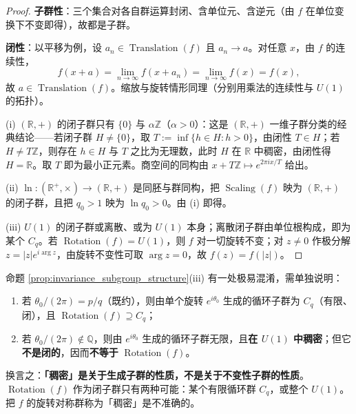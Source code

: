 \begin{proof}
\textbf{子群性}：三个集合对各自群运算封闭、含单位元、含逆元（由 $f$ 在单位变换下不变即得），故都是子群。

\textbf{闭性}：以平移为例，设 $a_n\in\operatorname{Translation}(f)$ 且 $a_n\to a$。对任意 $x$，由 $f$ 的连续性，
\[
f(x+a)=\lim_{n\to\infty}f(x+a_n)=\lim_{n\to\infty}f(x)=f(x),
\]
故 $a\in\operatorname{Translation}(f)$。缩放与旋转情形同理（分别用乘法的连续性与 $U(1)$ 的拓扑）。

(i) $(\mathbb{R},+)$ 的闭子群只有 $\{0\}$ 与 $\alpha\mathbb{Z}$（$\alpha>0$）：这是 $(\mathbb{R},+)$ 一维子群分类的经典结论——若闭子群 $H\neq\{0\}$，取 $T:=\inf\{h\in H:h>0\}$，由闭性 $T\in H$；若 $H\neq T\mathbb{Z}$，则存在 $h\in H$ 与 $T$ 之比为无理数，此时 $H$ 在 $\mathbb{R}$ 中稠密，由闭性得 $H=\mathbb{R}$。取 $T$ 即为最小正元素。商空间的同构由 $x+T\mathbb{Z}\mapsto e^{2\pi ix/T}$ 给出。

(ii) $\ln:(\mathbb{R}^+,\times)\to(\mathbb{R},+)$ 是同胚与群同构，把 $\operatorname{Scaling}(f)$ 映为 $(\mathbb{R},+)$ 的闭子群，且把 $q_0>1$ 映为 $\ln q_0>0$。由 (i) 即得。

(iii) $U(1)$ 的闭子群或离散、或为 $U(1)$ 本身；离散闭子群由单位根构成，即为某个 $C_q$。若 $\operatorname{Rotation}(f)=U(1)$，则 $f$ 对一切旋转不变；对 $z\neq0$ 作极分解 $z=|z|e^{i\arg z}$，由旋转不变性可取 $\arg z=0$，故 $f(z)=f(|z|)$。
\end{proof}

\begin{remark}[关于「稠密」的正确表述]\label{rem:rotation_dense_corrected}
命题 \ref{prop:invariance_subgroup_structure}(iii) 有一处极易混淆，需单独说明：
\begin{enumerate}[label=(\roman*)]
    \item 若 $\theta_0/(2\pi)=p/q$（既约），则由单个旋转 $e^{i\theta_0}$ 生成的循环子群为 $C_q$（有限、闭），且 $\operatorname{Rotation}(f)\supseteq C_q$；
    \item 若 $\theta_0/(2\pi)\notin\mathbb{Q}$，则由 $e^{i\theta_0}$ 生成的循环子群无限，且\textbf{在 $U(1)$ 中稠密}；但它\textbf{不是闭的}，因而\textbf{不等于} $\operatorname{Rotation}(f)$。
\end{enumerate}
换言之：\textbf{「稠密」是关于生成子群的性质，不是关于不变性子群的性质}。$\operatorname{Rotation}(f)$ 作为闭子群只有两种可能：某个有限循环群 $C_q$，或整个 $U(1)$。把 $f$ 的旋转对称群称为「稠密」是不准确的。
\end{remark}

